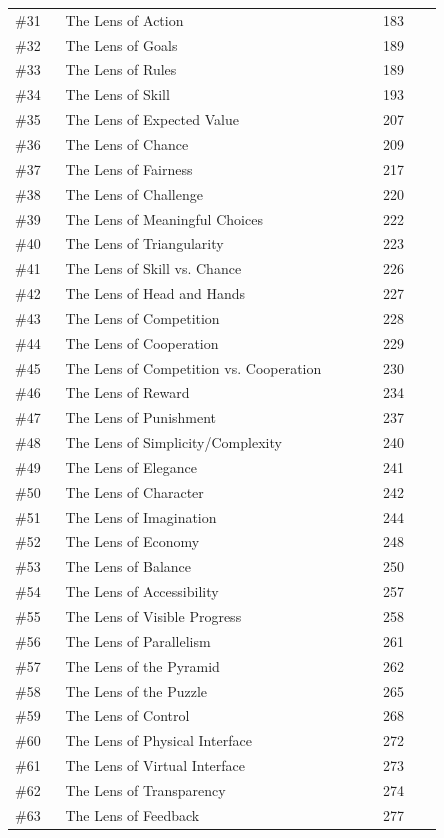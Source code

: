 \documentclass[11pt]{article}
\begin{document}
\begin{longtable}{@{}p{0.10\linewidth}p{0.63\linewidth}p{0.12\linewidth}@{}}
\#31 & The Lens of Action & 183 \\
\#32 & The Lens of Goals & 189 \\
\#33 & The Lens of Rules & 189 \\
\#34 & The Lens of Skill & 193 \\
\#35 & The Lens of Expected Value & 207 \\
\#36 & The Lens of Chance & 209 \\
\#37 & The Lens of Fairness & 217 \\
\#38 & The Lens of Challenge & 220 \\
\#39 & The Lens of Meaningful Choices & 222 \\
\#40 & The Lens of Triangularity & 223 \\
\#41 & The Lens of Skill vs. Chance & 226 \\
\#42 & The Lens of Head and Hands & 227 \\
\#43 & The Lens of Competition & 228 \\
\#44 & The Lens of Cooperation & 229 \\
\#45 & The Lens of Competition vs. Cooperation & 230 \\
\#46 & The Lens of Reward & 234 \\
\#47 & The Lens of Punishment & 237 \\
\#48 & The Lens of Simplicity/Complexity & 240 \\
\#49 & The Lens of Elegance & 241 \\
\#50 & The Lens of Character & 242 \\
\#51 & The Lens of Imagination & 244 \\
\#52 & The Lens of Economy & 248 \\
\#53 & The Lens of Balance & 250 \\
\#54 & The Lens of Accessibility & 257 \\
\#55 & The Lens of Visible Progress & 258 \\
\#56 & The Lens of Parallelism & 261 \\
\#57 & The Lens of the Pyramid & 262 \\
\#58 & The Lens of the Puzzle & 265 \\
\#59 & The Lens of Control & 268 \\
\#60 & The Lens of Physical Interface & 272 \\
\#61 & The Lens of Virtual Interface & 273 \\
\#62 & The Lens of Transparency & 274 \\
\#63 & The Lens of Feedback & 277 \\

\end{longtable}
\end{document}
